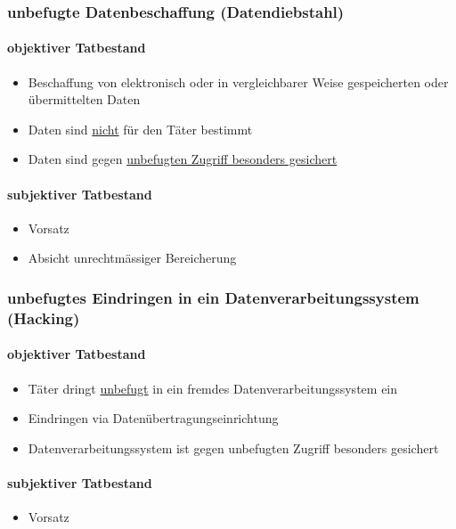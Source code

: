\subsubsection{unbefugte Datenbeschaffung (Datendiebstahl)}
\paragraph{objektiver Tatbestand}
\begin{itemize}
    \item Beschaffung von elektronisch oder in vergleichbarer Weise gespeicherten oder übermittelten Daten
    \item Daten sind \underline{nicht} für den Täter bestimmt
    \item Daten sind gegen \underline{unbefugten Zugriff besonders gesichert}
\end{itemize}

\paragraph{subjektiver Tatbestand}
\begin{itemize}
    \item Vorsatz
    \item Absicht unrechtmässiger Bereicherung
\end{itemize}

\subsubsection{unbefugtes Eindringen in ein Datenverarbeitungssystem (Hacking)}
\paragraph{objektiver Tatbestand}
\begin{itemize}
    \item Täter dringt \underline{unbefugt} in ein fremdes Datenverarbeitungssystem ein
    \item Eindringen via Datenübertragungseinrichtung
    \item Datenverarbeitungssystem ist gegen unbefugten Zugriff besonders gesichert
\end{itemize}

\paragraph{subjektiver Tatbestand}
\begin{itemize}
    \item Vorsatz
\end{itemize}

